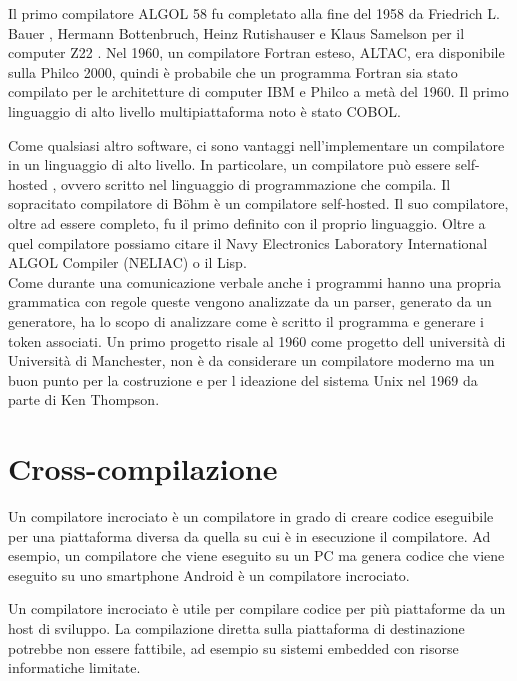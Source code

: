 \documentclass[12pt,a4paper]{report}
\begin{document}
Il primo compilatore ALGOL 58 fu completato alla fine del 1958 da Friedrich L. Bauer , Hermann Bottenbruch, Heinz Rutishauser e Klaus Samelson per il computer Z22 . 
Nel 1960, un compilatore Fortran esteso, ALTAC, era disponibile sulla Philco 2000, quindi è probabile che un programma Fortran sia stato compilato per le architetture di computer IBM e Philco a metà del 1960.  Il primo linguaggio di alto livello multipiattaforma noto è stato COBOL. 

Come qualsiasi altro software, ci sono vantaggi nell'implementare un compilatore in un linguaggio di alto livello. In particolare, un compilatore può essere self-hosted , ovvero scritto nel linguaggio di programmazione che compila. Il sopracitato compilatore di Böhm è un compilatore self-hosted. Il suo compilatore, oltre ad essere completo, fu il primo definito con il proprio linguaggio.
Oltre a quel compilatore possiamo citare il Navy Electronics Laboratory International ALGOL Compiler (NELIAC) o il Lisp.\\

Come durante una comunicazione verbale anche i programmi hanno una propria grammatica con regole queste vengono analizzate da un parser, generato da un generatore, ha lo scopo di analizzare come è scritto il programma e generare i token associati. Un primo progetto risale al 1960 come progetto dell università di Università di Manchester, non è da considerare un compilatore moderno ma un buon punto per la costruzione e per l ideazione del sistema Unix nel 1969 da parte di Ken Thompson.\\

\section{Cross-compilazione}
\label{Sec:Cross}
Un compilatore incrociato è un compilatore in grado di creare codice eseguibile per una piattaforma diversa da quella su cui è in esecuzione il compilatore. Ad esempio, un compilatore che viene eseguito su un PC ma genera codice che viene eseguito su uno smartphone Android è un compilatore incrociato.


Un compilatore incrociato è utile per compilare codice per più piattaforme da un host di sviluppo. La compilazione diretta sulla piattaforma di destinazione potrebbe non essere fattibile, ad esempio su sistemi embedded con risorse informatiche limitate.
\end{document}
